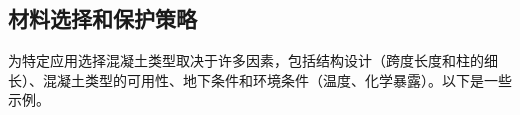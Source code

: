 \subsection{材料选择和保护策略}

为特定应用选择混凝土类型取决于许多因素，包括结构设计（跨度长度和柱的细长）、混凝土类型的可用性、地下条件和环境条件（温度、化学暴露）。以下是一些示例。

